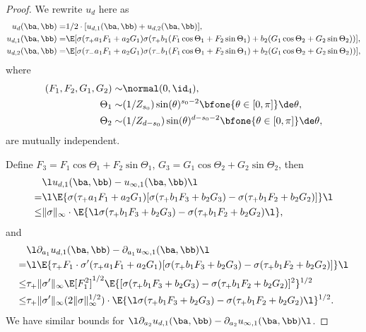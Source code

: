 \documentclass[11pt]{article}
\begin{document}
\begin{proof}
We rewrite $u_d$ here as
\[
\begin{aligned}
u_d(\ba, \bb) =& 1/2 \cdot [u_{d, 1}(\ba, \bb) + u_{d, 2}(\ba, \bb)], \\
u_{d, 1}(\ba, \bb) =& \E[\sigma(\tau_{+} a_1  F_1 + a_2  G_1) \sigma(\tau_{+} b_1 (F_1 \cos \Theta_1 + F_2 \sin \Theta_1)  + b_2 (G_1 \cos \Theta_2 + G_2 \sin \Theta_2))],\\
u_{d, 2}(\ba, \bb) =& \E[\sigma(\tau_{-} a_1  F_1 + a_2  G_1) \sigma(\tau_{-} b_1 (F_1 \cos \Theta_1 + F_2 \sin \Theta_1)  + b_2 (G_1 \cos \Theta_2 + G_2 \sin \Theta_2))],\\
\end{aligned}
\]
where 
\begin{align}
(F_1, F_2, G_1, G_2) \sim& \normal(0, \id_4),\\
\Theta_1 \sim& (1/Z_{s_0})\sin(\theta)^{s_0 -2} \bfone\{ \theta \in [0, \pi] \} \de \theta,\\
\Theta_2 \sim& (1 / Z_{d - s_0}) \sin(\theta)^{d - s_0 -2} \bfone\{ \theta \in [0, \pi] \} \de \theta,
\end{align}
are mutually independent. 

Define $F_3 = F_1 \cos \Theta_1 + F_2 \sin \Theta_1$, $G_3 = G_1 \cos \Theta_2 + G_2 \sin \Theta_2$, then
\begin{equation}
\begin{aligned}
& \l  u_{d, 1}(\ba, \bb) -  u_{\infty, 1}(\ba, \bb) \l \\
=& \l \E\{\sigma(\tau_{+} a_1  F_1 + a_2  G_1) [\sigma(\tau_{+} b_1  F_3 + b_2  G_3) - \sigma(\tau_{+} b_1  F_2 + b_2  G_2)] \} \l\\
\le& \| \sigma \|_\infty \cdot \E\{\l \sigma(\tau_{+} b_1  F_3 + b_2  G_3) - \sigma(\tau_{+} b_1  F_2 + b_2  G_2) \l \},
\end{aligned}
\end{equation}
and
\begin{equation}
\begin{aligned}
& \l \partial_{a_1} u_{d, 1}(\ba, \bb) - \partial_{a_1} u_{\infty, 1}(\ba, \bb) \l \\
=& \l \E\{ \tau_{+} F_1 \cdot \sigma'(\tau_{+} a_1  F_1 + a_2  G_1) [\sigma(\tau_{+} b_1  F_3 + b_2  G_3) - \sigma(\tau_{+} b_1  F_2 + b_2  G_2)] \} \l\\
\le&  \tau_{+} \| \sigma' \|_\infty \E[F_1^2]^{1/2} \E\{ [\sigma(\tau_{+} b_1  F_3 + b_2  G_3) - \sigma(\tau_{+} b_1  F_2 + b_2  G_2)]^2 \}^{1/2}\\
\le&  \tau_{+} \| \sigma' \|_\infty  (2 \| \sigma \|_\infty^{1/2}) \cdot \E\{\l \sigma(\tau_{+} b_1  F_3 + b_2  G_3) - \sigma(\tau_{+} b_1  F_2 + b_2  G_2) \l \}^{1/2}.
\end{aligned}
\end{equation}
We have similar bounds for $\l \partial_{a_2} u_{d, 1}(\ba, \bb) - \partial_{a_2} u_{\infty, 1}(\ba, \bb) \l$. 


\end{proof}
\end{document}
